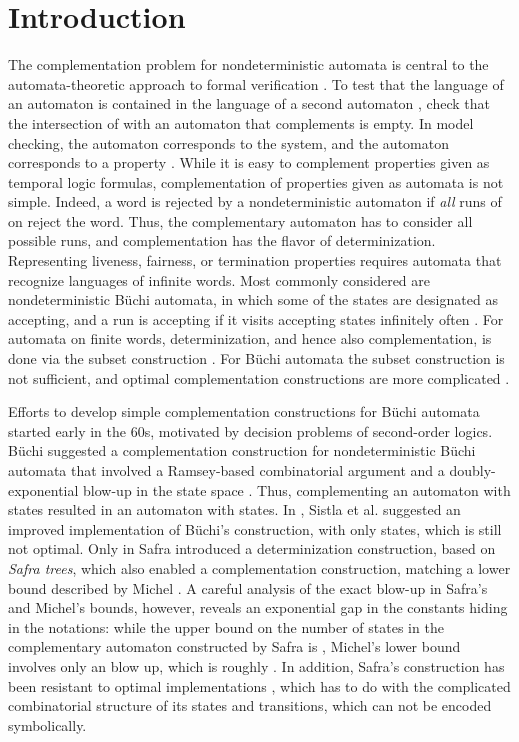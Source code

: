 \documentclass{LMCS}
\newcommand\buchi{B\"uchi\xspace}
\begin{document}
\section{Introduction}
The complementation problem for nondeterministic automata is central to the automata-theoretic
approach to formal verification \cite{Var07a}.  To test that the language of an automaton  is
contained in the language of a second automaton , check that the intersection of  with an
automaton that complements  is empty.  In model checking, the automaton  corresponds to
the system, and the automaton  corresponds to a property \cite{VW86b}.  While it is easy to
complement properties given as temporal logic formulas, complementation of properties given as
automata is not simple. Indeed, a word  is rejected by a nondeterministic automaton  if
\emph{all} runs of  on  reject the word. Thus, the complementary automaton has to consider
all possible runs, and complementation has the flavor of determinization.  Representing liveness,
fairness, or termination properties requires automata that recognize languages of infinite words.
Most commonly considered are nondeterministic \buchi automata, in which some of the states are
designated as accepting, and a run is accepting if it visits accepting states infinitely often
\cite{Buc62}.  For automata on finite words, determinization, and hence also complementation, is
done via the subset construction \cite{RS59}.  For B\"uchi automata the subset construction is not
sufficient, and optimal complementation constructions are more complicated \cite{Var07b}.

Efforts to develop simple complementation constructions for \buchi automata started early
in the 60s, motivated by decision problems of second-order logics.  \buchi suggested a
complementation construction for nondeterministic \buchi automata that involved a 
Ramsey-based combinatorial argument and a doubly-exponential blow-up in the state space
\cite{Buc62}.  Thus, complementing an automaton with  states resulted in an automaton with
 states.  In \cite{SVW87}, Sistla et al. suggested an improved implementation of
B\"uchi's construction, with only  states, which is still not optimal.  Only
in \cite{Saf88} Safra introduced a determinization construction, based on {\em Safra trees}, which also
enabled a  complementation construction, matching a lower bound described by Michel
\cite{Mic88}.  A careful analysis of the exact blow-up in Safra's and Michel's bounds, however,
reveals an exponential gap in the constants hiding in the  notations: while the upper bound on
the number of states in the complementary automaton constructed by Safra is , Michel's lower
bound involves only an  blow up, which is roughly . In addition, Safra's construction
has been resistant to optimal implementations \cite{ATW06,THB95}, which has to do with the complicated
combinatorial structure of its states and transitions, which can not be encoded symbolically.
\end{document}
